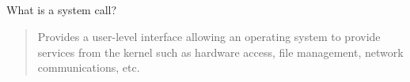 \subsection*{}
What is a system call?
\begin{quote}
    Provides a user-level interface allowing an operating system to provide services from the kernel such as hardware access, file management, network communications, etc.
\end{quote}
    
